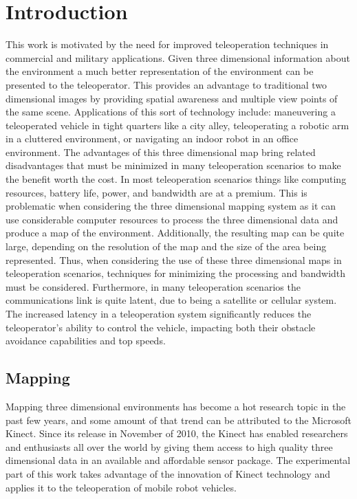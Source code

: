 \documentclass[12pt]{report}
\begin{document}
\normalem       %


\chapter{Introduction}\label{chap:introduction}
This work is motivated by the need for improved teleoperation techniques in commercial and military applications.  Given three dimensional information about the environment a much better representation of the environment can be presented to the teleoperator.  This provides an advantage to traditional two dimensional images by providing spatial awareness and multiple view points of the same scene.  Applications of this sort of technology include: maneuvering a teleoperated vehicle in tight quarters like a city alley, teleoperating a robotic arm in a cluttered environment, or navigating an indoor robot in an office environment.  The advantages of this three dimensional map bring related disadvantages that must be minimized in many teleoperation scenarios to make the benefit worth the cost.  In most teleoperation scenarios things like computing resources, battery life, power, and bandwidth are at a premium.  This is problematic when considering the three dimensional mapping system as it can use considerable computer resources to process the three dimensional data and produce a map of the environment.  Additionally, the resulting map can be quite large, depending on the resolution of the map and the size of the area being represented.  Thus, when considering the use of these three dimensional maps in teleoperation scenarios, techniques for minimizing the processing and bandwidth must be considered.  Furthermore, in many teleoperation scenarios the communications link is quite latent, due to being a satellite or cellular system.  The increased latency in a teleoperation system significantly reduces the teleoperator's ability to control the vehicle, impacting both their obstacle avoidance capabilities and top speeds\cite{photo_real}.

\section{Mapping}
Mapping three dimensional environments has become a hot research topic in the past few years, and some amount of that trend can be attributed to the Microsoft Kinect\cite{KINECT}.  Since its release in November of 2010\cite{GIZMODO}, the Kinect has enabled researchers and enthusiasts all over the world by giving them access to high quality three dimensional data in an available and affordable sensor package.  The experimental part of this work takes advantage of the innovation of Kinect technology and applies it to the teleoperation of mobile robot vehicles.
\end{document}
